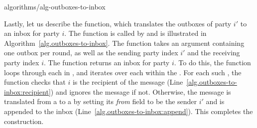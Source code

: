 {algorithms/alg-outboxes-to-inbox}

Lastly, let us describe the \outboxesToInbox function, which translates the outboxes
of party $i'$ to an inbox for party $i$. The function is called by \prepareSimulationInputs
and is illustrated in Algorithm~\ref{alg.outboxes-to-inbox}. The function takes an
\outboxes argument containing one outbox per round, as well as the sending party index
$i'$ and the receiving party index $i$. The function returns an inbox for party $i$.
To do this, the function loops through each \outbox in \outboxes, and iterates over each
\netin within the \outbox. For each such \netout, the function checks that $i$ is the
recipient of the message (Line~\ref{alg.outboxes-to-inbox:recipient}) and ignores the
message if not. Otherwise, the message is translated from a \netout to a \netin
by setting its \emph{from} field to be the sender $i'$ and is
appended to the inbox (Line~\ref{alg.outboxes-to-inbox:append}).
This completes the construction.

